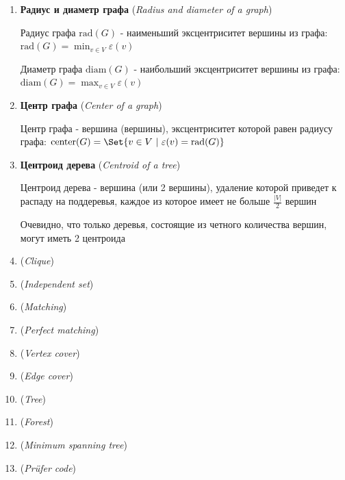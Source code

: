 \documentclass[12pt]{article}
\begin{document}
\begin{enumerate}
        \item \textbf{Радиус и диаметр графа} (\textit{Radius and diameter of a graph})

        Радиус графа $\text{rad}(G)$ - наименьший эксцентриситет вершины из графа: $\text{rad}(G) = \min_{v \in V} \varepsilon(v)$

        Диаметр графа $\text{diam}(G)$ - наибольший эксцентриситет вершины из графа: $\text{diam}(G) = \max_{v \in V} \varepsilon(v)$

        \item \textbf{Центр графа} (\textit{Center of a graph})

        Центр графа - вершина (вершины), эксцентриситет которой равен радиусу графа: $\text{center}(G) = \Set{v \in V \ | \ \varepsilon(v) = \text{rad}(G)}$

        \item \textbf{Центроид дерева} (\textit{Centroid of a tree})

        Центроид дерева - вершина (или 2 вершины), удаление которой приведет к распаду на поддеревья, каждое из которое имеет не больше $\frac{|V|}{2}$ вершин

        Очевидно, что только деревья, состоящие из четного количества вершин, могут иметь 2 центроида


        \item \textbf{} (\textit{Clique})

        \item \textbf{} (\textit{Independent set})

        \item \textbf{} (\textit{Matching})

        \item \textbf{} (\textit{Perfect matching})

        \item \textbf{} (\textit{Vertex cover})

        \item \textbf{} (\textit{Edge cover})

        \item \textbf{} (\textit{Tree})

        \item \textbf{} (\textit{Forest})

        \item \textbf{} (\textit{Minimum spanning tree})

        \item \textbf{} (\textit{Prüfer code})


\end{enumerate}
\end{document}
